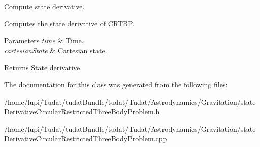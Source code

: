 Compute state derivative. 

Computes the state derivative of C\+R\+T\+BP. 
\begin{DoxyParams}{Parameters}
{\em time} & \hyperlink{classtudat_1_1Time}{Time}. \\
\hline
{\em cartesian\+State} & Cartesian state. \\
\hline
\end{DoxyParams}
\begin{DoxyReturn}{Returns}
State derivative. 
\end{DoxyReturn}


The documentation for this class was generated from the following files\+:\begin{DoxyCompactItemize}
\item 
/home/lupi/\+Tudat/tudat\+Bundle/tudat/\+Tudat/\+Astrodynamics/\+Gravitation/state\+Derivative\+Circular\+Restricted\+Three\+Body\+Problem.\+h\item 
/home/lupi/\+Tudat/tudat\+Bundle/tudat/\+Tudat/\+Astrodynamics/\+Gravitation/state\+Derivative\+Circular\+Restricted\+Three\+Body\+Problem.\+cpp\end{DoxyCompactItemize}
